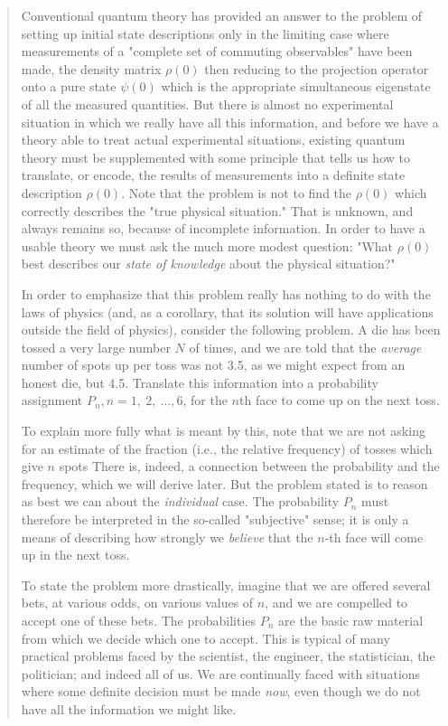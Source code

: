 \documentclass[]{article}
\begin{document}
\begin{quote}
Conventional quantum theory has provided an answer to the problem of
setting up initial state descriptions only in the limiting case where
measurements of a "complete set of commuting observables" have been
made, the density matrix \(\rho(0)\) then reducing to the projection
operator onto a pure state \(\psi(0)\) which is the appropriate
simultaneous eigenstate of all the measured quantities. But there is
almost no experimental situation in which we really have all this
information, and before we have a theory able to treat actual
experimental situations, existing quantum theory must be supplemented
with some principle that tells us how to translate, or encode, the
results of measurements into a definite state description \(\rho(0)\).
Note that the problem is not to find the \(\rho(0)\) which correctly
describes the "true physical situation." That is unknown, and always
remains so, because of incomplete information. In order to have a usable
theory we must ask the much more modest question: "What \(\rho(0)\) best
describes our \emph{state of knowledge} about the physical situation?"

In order to emphasize that this problem really has nothing to do with
the laws of physics (and, as a corollary, that its solution will have
applications outside the field of physics), consider the following
problem. A die has been tossed a very large number \(N\) of times, and
we are told that the \emph{average} number of spots up per toss was not
3.5, as we might expect from an honest die, but 4.5. Translate this
information into a probability assignment
\(P_{n},n = 1,\ 2,\ \ldots,6\), for the \(n\)th face to come up on the
next toss.

To explain more fully what is meant by this, note that we are not asking
for an estimate of the fraction (i.e., the relative frequency) of tosses
which give \(n\) spots There is, indeed, a connection between the
probability and the frequency, which we will derive later. But the
problem stated is to reason as best we can about the \emph{individual}
case. The probability \(P_{n}\) must therefore be interpreted in the
so-called "subjective" sense; it is only a means of describing how
strongly we \emph{believe} that the \(n\)-th face will come up in the
next toss.

To state the problem more drastically, imagine that we are offered
several bets, at various odds, on various values of \(n\), and we are
compelled to accept one of these bets. The probabilities \(P_{n}\) are
the basic raw material from which we decide which one to accept. This is
typical of many practical problems faced by the scientist, the engineer,
the statistician, the politician; and indeed all of us. We are
continually faced with situations where some definite decision must be
made \emph{now}, even though we do not have all the information we might
like.


\end{quote}
\end{document}
